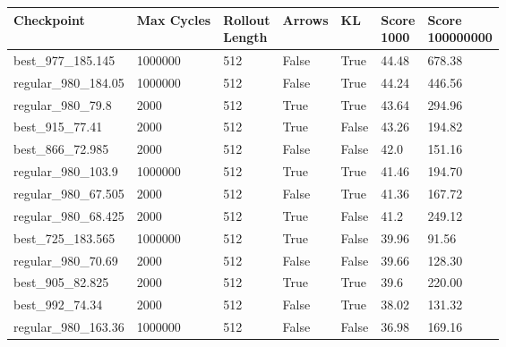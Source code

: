 \documentclass[12pt,a4paper, onecolumn]{exam}
\begin{document}
\begin{appendices}
    \begin{table}[H]
        \centering
        \begin{tabular}{|l|l|l|l|l|l|l|}
            \hline
            \textbf{Checkpoint}  & \textbf{Max Cycles} & \shortstack{\textbf{Rollout}
            \\\textbf{Length}} & \textbf{Arrows} & \textbf{KL} & \shortstack{\textbf{Score}\\\textbf{1000}} & \shortstack{\textbf{Score}\\\textbf{100000000}} \\
            \hline
            best\_977\_185.145   & 1000000             & 512                          & False & True  & 44.48 & 678.38 \\
            regular\_980\_184.05 & 1000000             & 512                          & False & True  & 44.24 & 446.56 \\
            regular\_980\_79.8   & 2000                & 512                          & True  & True  & 43.64 & 294.96 \\
            best\_915\_77.41     & 2000                & 512                          & True  & False & 43.26 & 194.82 \\
            best\_866\_72.985    & 2000                & 512                          & False & False & 42.0  & 151.16 \\
            regular\_980\_103.9  & 1000000             & 512                          & True  & True  & 41.46 & 194.70 \\
            regular\_980\_67.505 & 2000                & 512                          & False & True  & 41.36 & 167.72 \\
            regular\_980\_68.425 & 2000                & 512                          & True  & False & 41.2  & 249.12 \\
            best\_725\_183.565   & 1000000             & 512                          & True  & False & 39.96 & 91.56  \\
            regular\_980\_70.69  & 2000                & 512                          & False & False & 39.66 & 128.30 \\
            best\_905\_82.825    & 2000                & 512                          & True  & True  & 39.6  & 220.00 \\
            best\_992\_74.34     & 2000                & 512                          & False & True  & 38.02 & 131.32 \\
            regular\_980\_163.36 & 1000000             & 512                          & False & False & 36.98 & 169.16 \\

\end{tabular}
\end{table}
\end{appendices}
\end{document}
